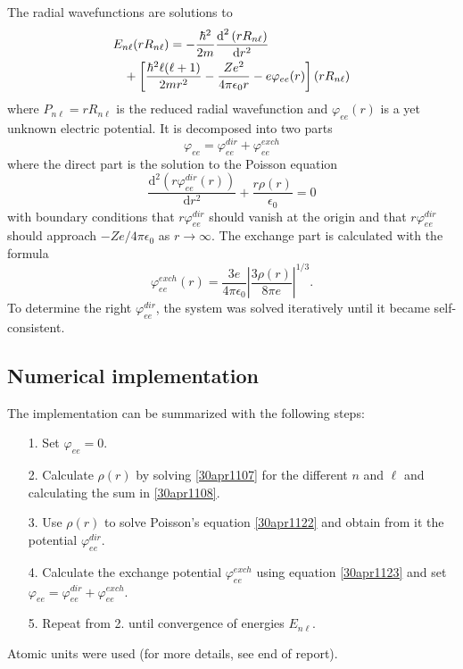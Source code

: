 \documentclass[twocolumn]{article}
\begin{document}
\begin{large}
The radial wavefunctions are solutions to 
\begin{equation}
    \label{30apr1107}
    \begin{split}
        &E_{n\ell}(rR_{n\ell}) = -\frac{\hbar^2}{2m}\frac{\text{d}^2\left(rR_{n\ell}\right)}{\text{d}r^2}  \\ 
        &\hspace{0.3cm} + \left[\frac{\hbar^2\ell(\ell+1)}{2mr^2}-\frac{Ze^2}{4\pi\epsilon_0r}-e\varphi_{ee}(r)\right](rR_{n\ell}) 
    \end{split}
\end{equation}
where $P_{n\ell} = rR_{n\ell}$ is the reduced radial wavefunction and $\varphi_{ee}(r)$ is a yet unknown electric potential. It is decomposed into two parts 
\begin{equation}
    \varphi_{ee} = \varphi_{ee}^{dir} + \varphi_{ee}^{exch}
\end{equation}
where the direct part is the solution to the Poisson equation
\begin{equation}
    \label{30apr1122}
    \frac{\text{d}^2(r\varphi_{ee}^{dir}(r))}{\text{d}r^2} +\frac{r\rho(r)}{\epsilon_0} = 0
\end{equation} 
with boundary conditions that $r\varphi_{ee}^{dir}$ should vanish at the origin and that $r\varphi_{ee}^{dir}$ should approach $-Ze/4\pi\epsilon_0$ as $r\to\infty$. The exchange part is calculated with the formula
\begin{equation}
    \label{30apr1123}
    \varphi_{ee}^{exch}(r) = \frac{3e}{4\pi\epsilon_0}\left|\frac{3\rho(r)}{8\pi e}\right|^{1/3}.
\end{equation}
To determine the right $\varphi_{ee}^{dir}$, the system was solved iteratively until it became self-consistent. 

\subsection*{Numerical implementation}
The implementation can be summarized with the following steps:
\begin{itemize}
    \item[1.] Set $\varphi_{ee}=0$.
    \item[2.] Calculate $\rho(r)$ by solving \eqref{30apr1107} for the different $n$ and $\ell$ and calculating the sum in \eqref{30apr1108}.
    \item[3.] Use $\rho(r)$ to solve Poisson's equation \eqref{30apr1122} and obtain from it the potential $\varphi_{ee}^{dir}$.
    \item[4.] Calculate the exchange potential $\varphi_{ee}^{exch}$ using equation \eqref{30apr1123} and set $\varphi_{ee} = \varphi_{ee}^{dir} + \varphi_{ee}^{exch}$. 
    \item[5.] Repeat from 2. until convergence of energies $E_{n\ell}$. 
\end{itemize}
Atomic units were used (for more details, see end of report).


\end{large}
\end{document}
